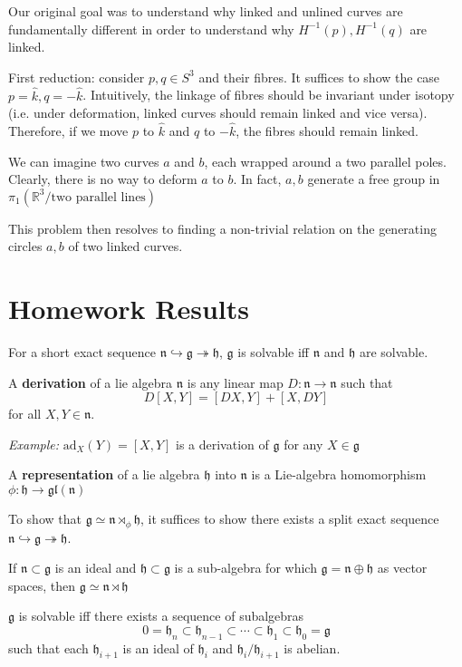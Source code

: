 \documentclass[12pt]{article}
\renewcommand{\hat}[1]{\widehat{#1}}
\newcommand{\R}{\mathbb{R}}
\newcommand{\g}{\mathfrak{g}}
\newcommand{\h}{\mathfrak{h}}
\newcommand{\gl}{\mathfrak{gl}}
\newcommand{\ad}{\text{ad}}
\newcommand{\khat}{\hat{k}}
\begin{document}
Our original goal was to understand why linked and unlined curves are fundamentally different in order to understand why $H^{-1}(p), H^{-1}(q)$ are linked.

First reduction: consider $p, q \in S^3$ and their fibres. It suffices to show the case $p = \khat, q = -\khat$. Intuitively, the linkage of fibres should be invariant under isotopy (i.e. under deformation, linked curves should remain linked and vice versa). Therefore, if we move $p$ to $\khat$ and $q$ to $-\khat$, the fibres should remain linked.

We can imagine two curves $a$ and $b$, each wrapped around a two parallel poles. Clearly, there is no way to deform $a$ to $b$. In fact, $a, b$ generate a free group in $\pi_1(\R^3/\text{two parallel lines})$

This problem then resolves to finding a non-trivial relation on the generating circles $a, b$ of two linked curves.

\pagebreak 

\section{Homework Results}
For a short exact sequence $\mathfrak{n} \hookrightarrow \mathfrak{g} \twoheadrightarrow \mathfrak{h}$, $\mathfrak{g}$ is solvable iff $\mathfrak{n}$ and $\mathfrak{h}$ are solvable.

A \textbf{derivation} of a lie algebra $\mathfrak{n}$ is any linear map $D: \mathfrak{n} \to \mathfrak{n}$ such that 
\[D[X, Y] = [DX, Y] + [X, DY]\]
for all $X, Y \in \mathfrak{n}$.

\emph{Example:} $\ad_X(Y) = [X, Y]$ is a derivation of $\mathfrak{g}$ for any $X \in \mathfrak{g}$ 

A \textbf{representation} of a lie algebra $\h$ into $\mathfrak{n}$ is a Lie-algebra homomorphism $\phi: \h \to \gl(\mathfrak{n})$ 

To show that $\g \simeq \mathfrak{n} \rtimes_{\phi} \h$, it suffices to show there exists a split exact sequence $\mathfrak{n} \hookrightarrow \g \twoheadrightarrow \h$. 

If $\mathfrak{n} \subset \g$ is an ideal and $\h \subset \g$ is a sub-algebra for which $\g = \mathfrak{n} \oplus \h$ as vector spaces, then $\g \simeq \mathfrak{n} \rtimes \h$

$\g$ is solvable iff there exists a sequence of subalgebras 
\[0 = \h_n \subset \h_{n-1} \subset \cdots \subset \h_1 \subset \h_0 = \g\]
such that each $\h_{i+1}$ is an ideal of $\h_i$ and $\h_i/\h_{i+1}$ is abelian.
\end{document}

